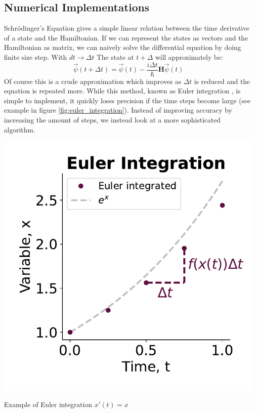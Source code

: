\subsection{Numerical Implementations}\label{sec:numerical_implementations}
Schrödinger's Equation gives a simple linear relation between the time derivative of a state and the Hamiltonian. If we can represent the states as vectors and the Hamiltonian as matrix, we can naively solve the differential equation by doing finite size step. With $dt\to\Delta t$ The state at $t+\Delta$ will approximately be:
\begin{equation}
    \Vec{\psi}(t + \Delta t) =  \Vec{\psi}(t) - \frac{i\Delta t}{\hbar}\boldsymbol{H} \Vec{\psi}(t)
\end{equation}
Of course this is a crude approximation which improves as $\Delta t$ is reduced and the equation is repeated more. While this method, known as Euler integration \cite{butcher_numerical_2000}, is simple to implement, it quickly loses precision if the time steps become large (see example in figure \ref{fig:euler_integration}). Instead of improving accuracy by increasing the amount of steps, we instead look at a more sophisticated algorithm.
\begin{marginfigure}
    \centering
    \includegraphics[]{Figs/Theory/euler_integration.pdf}
    \caption{Example of Euler integration $x'(t) = x$}
    \label{fig:euler_integration}
\end{marginfigure}


